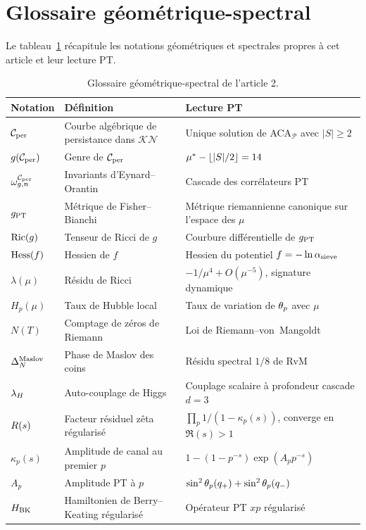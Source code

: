 \section{Glossaire géométrique-spectral}
\label{app:glossaire}

Le tableau~\ref{tab:glossaire2} récapitule les notations géométriques et spectrales propres à cet article et leur lecture PT.

\begin{table}[htbp]
\centering
\small
\begin{tabular}{@{}p{3.5cm}p{5cm}p{6cm}@{}}
\toprule
Notation & Définition & Lecture PT \\
\midrule
$\mathcal{C}_{\rm per}$ & Courbe algébrique de persistance dans $\mathcal{KN}$ & Unique solution de ACA$_{\mathcal P}$ avec $|S| \geq 2$ \\
$g(\mathcal{C}_{\rm per})$ & Genre de $\mathcal{C}_{\rm per}$ & $\mu^{*} - \lfloor |S|/2 \rfloor = 14$ \\
$\omega_{g,n}^{\mathcal{C}_{\rm per}}$ & Invariants d'Eynard--Orantin & Cascade des corrélateurs PT \\
$g_{\rm PT}$ & Métrique de Fisher--Bianchi & Métrique riemannienne canonique sur l'espace des $\mu$ \\
$\mathrm{Ric}(g)$ & Tenseur de Ricci de $g$ & Courbure différentielle de $g_{\rm PT}$ \\
$\mathrm{Hess}(f)$ & Hessien de $f$ & Hessien du potentiel $f = -\ln \alpha_{\rm sieve}$ \\
$\lambda(\mu)$ & Résidu de Ricci & $-1/\mu^{4} + O(\mu^{-5})$, signature dynamique \\
$H_p(\mu)$ & Taux de Hubble local & Taux de variation de $\theta_{p}$ avec $\mu$ \\
$N(T)$ & Comptage de zéros de Riemann & Loi de Riemann--von~Mangoldt \\
$\Delta_N^{\rm Maslov}$ & Phase de Maslov des coins & Résidu spectral $1/8$ de RvM \\
$\lambda_H$ & Auto-couplage de Higgs & Couplage scalaire à profondeur cascade $d=3$ \\
$R(s)$ & Facteur résiduel zêta régularisé & $\prod_p 1/(1 - \kappa_p(s))$, converge en $\Re(s) > 1$ \\
$\kappa_p(s)$ & Amplitude de canal au premier $p$ & $1 - (1 - p^{-s})\exp(A_p p^{-s})$ \\
$A_p$ & Amplitude PT à $p$ & $\sin^{2}\theta_{p}(q_{+}) + \sin^{2}\theta_{p}(q_{-})$ \\
$H_{\rm BK}$ & Hamiltonien de Berry--Keating régularisé & Opérateur PT $xp$ régularisé \\
\bottomrule
\end{tabular}
\caption{Glossaire géométrique-spectral de l'article 2.}
\label{tab:glossaire2}
\end{table}
